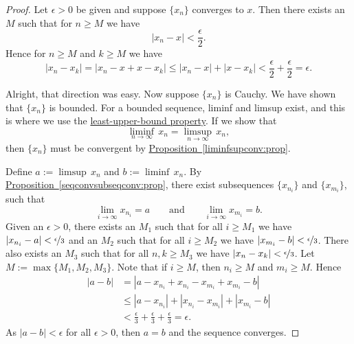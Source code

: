 \documentclass[12pt]{book}
\newcommand{\abs}[1]{\left\lvert {#1} \right\rvert}
\theoremstyle{plain}
\theoremstyle{remark}
\theoremstyle{definition}
\theoremstyle{exercise}
\theoremstyle{example}
\newcommand{\propref}[1]{\hyperref[#1]{Proposition~\ref*{#1}}}
\begin{document}
\begin{proof}
Let $\epsilon > 0$ be given and
suppose $\{ x_n \}$ converges to $x$.  Then there 
exists an $M$ such that for $n \geq M$ we have
\begin{equation*}
\abs{x_n - x} < \frac{\epsilon}{2} .
\end{equation*}
Hence for $n \geq M$ and $k \geq M$ we have
\begin{equation*}
\abs{x_n - x_k} = 
\abs{x_n - x + x - x_k}
\leq \abs{x_n-x} + \abs{x-x_k} < \frac{\epsilon}{2} + \frac{\epsilon}{2} =
\epsilon .
\end{equation*}

Alright, that direction was easy.  Now suppose $\{ x_n \}$ is Cauchy.
We have shown that $\{ x_n \}$ is bounded.
For a bounded sequence, liminf and limsup exist, and this is
where we use the
\hyperref[defn:lub]{least-upper-bound property}.
If we show that
\begin{equation*}
\liminf_{n\to \infty} \, x_n = \limsup_{n\to\infty} \, x_n ,
\end{equation*}
then $\{ x_n \}$ must be convergent by \propref{liminfsupconv:prop}.


Define $a := \limsup \, x_n$ and
$b := \liminf \, x_n$.
By \propref{seqconvsubseqconv:prop}, there exist subsequences
$\{ x_{n_i} \}$ and
$\{ x_{m_i} \}$, such that
\begin{equation*}
\lim_{i\to\infty} x_{n_i} = a
\qquad \text{and} \qquad
\lim_{i\to\infty} x_{m_i} = b.
\end{equation*}
Given an $\epsilon > 0$,
there exists an $M_1$ such that for all $i \geq M_1$
we have $\abs{x_{n_i} - a} < \nicefrac{\epsilon}{3}$ and
an $M_2$ such that for all $i \geq M_2$ we have
$\abs{x_{m_i} - b} < \nicefrac{\epsilon}{3}$.  There also exists an $M_3$
such that for all $n,k \geq M_3$ we have
$\abs{x_n-x_k} < \nicefrac{\epsilon}{3}$.  Let $M := \max \{ M_1, M_2, M_3 \}$.
Note that if $i \geq M$, then $n_i \geq M$ and $m_i \geq M$.  Hence
\begin{equation*}
\begin{split}
\abs{a-b} & =
\abs{a-x_{n_i}+x_{n_i}
-x_{m_i}+x_{m_i}
-b} \\
& \leq
\abs{a-x_{n_i}}
+ \abs{x_{n_i} -x_{m_i}}
+ \abs{x_{m_i} -b} \\
& <
\frac{\epsilon}{3}
+
\frac{\epsilon}{3}
+
\frac{\epsilon}{3}
= \epsilon .
\end{split}
\end{equation*}
As $\abs{a-b} < \epsilon$ for all $\epsilon > 0$, then $a=b$ and 
the sequence converges.
\end{proof}
\end{document}

